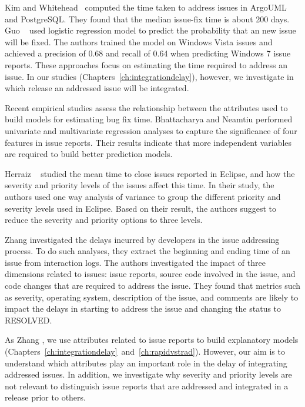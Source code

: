 Kim and Whitehead~\cite{Kim2006} computed the time taken to address issues in ArgoUML and
PostgreSQL. They found that the median issue-fix time is about 200 days. Guo \etal~\cite{Guo2010}
used logistic regression model to predict the probability that an new issue will be fixed. The
authors trained the model on Windows Vista issues and achieved a precision of 0.68 and recall of
0.64 when predicting Windows 7 issue reports. These approaches focus on estimating the time required
to address an issue. In our studies (Chapters~\ref{ch:integrationdelay}), however, we investigate in
which release an addressed issue will be integrated. 

Recent empirical studies assess the relationship between the attributes used to build models for
estimating bug fix time. Bhattacharya and Neamtiu \cite{Bhattacharya2011} performed univariate and
multivariate regression analyses to capture the significance of four features in issue reports.
Their results indicate that more independent variables are required to build better prediction
models. 

Herraiz \etal~\cite{Herraiz2008} studied the mean time to close issues reported in Eclipse, and how
the severity and priority levels of the issues affect this time. In their study, the authors used
one way analysis of variance to group the different priority and severity levels used in Eclipse.
Based on their result, the authors suggest to reduce the severity and priority options to three
levels. 

Zhang \etal \cite{Zhang2012} investigated the delays incurred by developers in the issue addressing
process. To do such analyses, they extract the beginning and ending time of an issue 
from interaction logs. The authors investigated the impact of three dimensions related to
issues: issue reports, source code involved in the issue, and code changes that are required to
address the issue. They found that metrics such as severity, operating system, description of the
issue, and comments are likely to impact the delays in starting to address the issue and changing
the status to RESOLVED. 

As Zhang \etal \cite{Zhang2012}, we use attributes related to issue reports to build explanatory
models (Chapters~\ref{ch:integrationdelay}~and~\ref{ch:rapidvstrad}). However, our aim is to
understand which attributes play an important role in the delay of integrating addressed issues.  In
addition, we investigate why severity and priority levels are not relevant to distinguish issue
reports that are addressed and integrated in a release prior to others.

